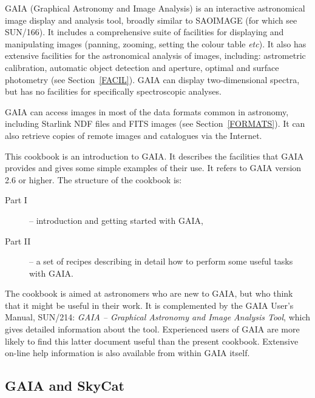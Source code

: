 \documentclass[twoside,11pt]{article}
\newcommand{\xref}[3]{#1}
\renewcommand{\_}{\texttt{\symbol{95}}}
\begin{document}
GAIA (Graphical Astronomy and Image Analysis) is an interactive
astronomical image display and analysis tool, broadly similar to SAOIMAGE
(for which see \xref{SUN/166}{sun166}{}\cite{SUN166}).  It includes a
comprehensive suite of facilities for displaying and manipulating images
(panning, zooming, setting the colour table \emph{etc}\/).  It also has
extensive facilities for the astronomical analysis of images, including:
astrometric calibration, automatic object detection and aperture, optimal
and surface photometry (see Section~\ref{FACIL}).  GAIA can display
two-dimensional spectra, but has no facilities for specifically
spectroscopic analyses.

GAIA can access images in most of the data formats common in astronomy,
including Starlink NDF files and FITS images (see Section~\ref{FORMATS}).
It can also retrieve copies of remote images and catalogues via the
Internet.

This cookbook is an introduction to GAIA.  It describes the facilities
that GAIA provides and gives some simple examples of their use.  It
refers to GAIA version 2.6 or higher.  The structure of the cookbook is:

\begin{description}

  \item[{\rm Part I}] -- introduction and getting started with GAIA,

  \item[{\rm Part II}] -- a set of recipes describing in detail how to
   perform some useful tasks with GAIA.

\end{description}

The cookbook is aimed at astronomers who are new to GAIA, but who think
that it might be useful in their work.  It is complemented by the GAIA
User's Manual, \xref{SUN/214: {\it GAIA -- Graphical Astronomy and Image
Analysis Tool}}{sun214}{}\/\cite{SUN214}, which gives detailed information
about the tool.  Experienced users of GAIA are more likely to find this
latter document useful than the present cookbook.  Extensive on-line
help information is also available from within GAIA itself.

\subsection{GAIA and SkyCat}
\end{document}
